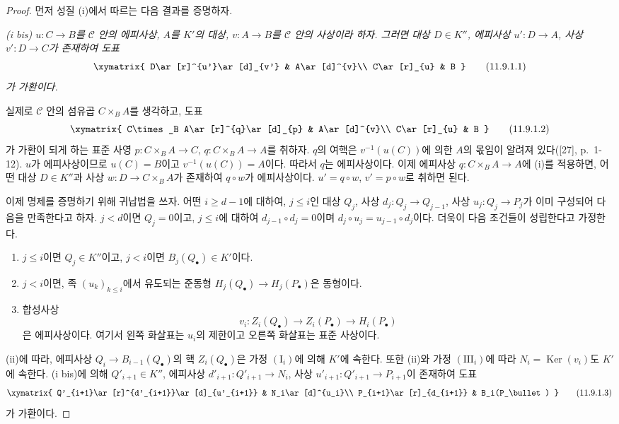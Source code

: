 \begin{proof}
먼저 성질 (i)에서 따르는 다음 결과를 증명하자.

\emph{(i bis) $u:C\to B$를 $\mathcal C$ 안의 에피사상, $A$를 $K'$의
대상, $v:A\to B$를 $\mathcal C$ 안의 사상이라 하자. 그러면 대상
$D\in K''$, 에피사상 $u':D\to A$, 사상 $v':D\to C$가 존재하여 도표}
\[
\xymatrix{
D\ar[r]^{u'}\ar[d]_{v'} & A\ar[d]^{v}\\
C\ar[r]_{u} & B
}
\tag{11.9.1.1}\label{0.11.9.1.1-fr}
\]
\emph{가 가환이다.}

실제로 $\mathcal C$ 안의 섬유곱 $C\times_B A$를 생각하고, 도표
\[
\xymatrix{
C\times_B A\ar[r]^{q}\ar[d]_{p} & A\ar[d]^{v}\\
C\ar[r]_{u} & B
}
\tag{11.9.1.2}\label{0.11.9.1.2-fr}
\]
가 가환이 되게 하는 표준 사영 $p:C\times_B A\to C$,
$q:C\times_B A\to A$를 취하자. $q$의 여핵은
$v^{-1}(u(C))$에 의한 $A$의 몫임이 알려져 있다([27], p.~1-12).
$u$가 에피사상이므로 $u(C)=B$이고 $v^{-1}(u(C))=A$이다. 따라서 $q$는
에피사상이다. 이제 에피사상 $q:C\times_B A\to A$에 (i)를 적용하면,
어떤 대상 $D\in K''$과 사상 $w:D\to C\times_B A$가 존재하여
$q\circ w$가 에피사상이다. $u'=q\circ w$, $v'=p\circ w$로 취하면 된다.

이제 명제를 증명하기 위해 귀납법을 쓰자. 어떤 $i\geq d-1$에 대하여,
$j\leq i$인 대상 $Q_j$, 사상 $d_j:Q_j\to Q_{j-1}$, 사상
$u_j:Q_j\to P_j$가 이미 구성되어 다음을 만족한다고 하자. $j<d$이면
$Q_j=0$이고, $j\leq i$에 대하여 $d_{j-1}\circ d_j=0$이며
$d_j\circ u_j=u_{j-1}\circ d_j$이다. 더욱이 다음 조건들이 성립한다고
가정한다.
\begin{enumerate}
\item[$(\mathrm I_i)$] $j\leq i$이면 $Q_j\in K''$이고, $j<i$이면
$B_j(Q_\bullet)\in K'$이다.
\item[$(\mathrm{II}_i)$] $j<i$이면, 족 $(u_k)_{k\leq i}$에서 유도되는
준동형 $H_j(Q_\bullet)\to H_j(P_\bullet)$은 동형이다.
\item[$(\mathrm{III}_i)$] 합성사상
\[
v_i:Z_i(Q_\bullet)\longrightarrow Z_i(P_\bullet)
\longrightarrow H_i(P_\bullet)
\]
은 에피사상이다. 여기서 왼쪽 화살표는 $u_i$의 제한이고 오른쪽 화살표는
표준 사상이다.
\end{enumerate}
(ii)에 따라, 에피사상 $Q_i\to B_{i-1}(Q_\bullet)$의 핵
$Z_i(Q_\bullet)$은 가정 $(\mathrm I_i)$에 의해 $K'$에 속한다. 또한 (ii)와
가정 $(\mathrm{III}_i)$에 따라 $N_i=\operatorname{Ker}(v_i)$도 $K'$에
속한다. (i bis)에 의해 $Q'_{i+1}\in K''$, 에피사상
$d'_{i+1}:Q'_{i+1}\to N_i$, 사상 $u'_{i+1}:Q'_{i+1}\to P_{i+1}$이
존재하여 도표
\[
\xymatrix{
Q'_{i+1}\ar[r]^{d'_{i+1}}\ar[d]_{u'_{i+1}} &
N_i\ar[d]^{u_i}\\
P_{i+1}\ar[r]_{d_{i+1}} & B_i(P_\bullet)
}
\tag{11.9.1.3}\label{0.11.9.1.3-fr}
\]
가 가환이다.


\end{proof}

